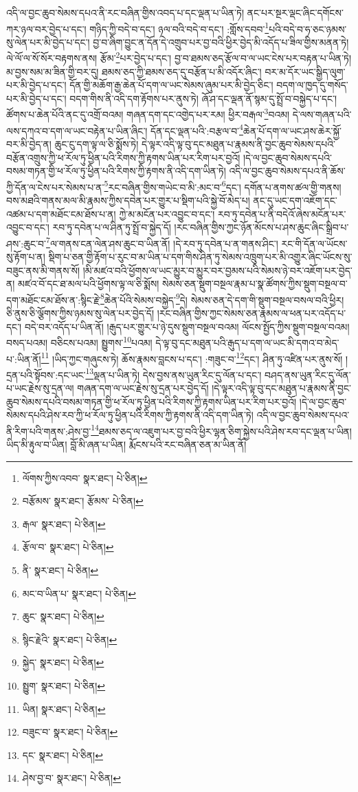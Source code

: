 འདི་ལ་བྱང་ཆུབ་སེམས་དཔའ་ནི་རང་བཞིན་གྱིས་འབད་པ་དང་ལྡན་པ་ཡིན་ཏེ། ནང་པར་སྔར་ལྡང་ཞིང་དགོངས་ཀར་ཉལ་བར་བྱེད་པ་དང་། གཉིད་ཀྱི་བདེ་བ་དང་། ཉལ་བའི་བདེ་བ་དང་། :གློས་དབབ་\footnote{ལོགས་ཀྱིས་འབབ་  སྣར་ཐང་།  པེ་ཅིན། }པའི་བདེ་བ་ཧ་ཅང་ཉམས་སུ་ལེན་པར་མི་བྱེད་པ་དང་། བྱ་བ་ཞིག་བྱུང་ན་དོན་དེ་འགྲུབ་པར་བྱ་བའི་ཕྱིར་བྱེད་མི་འདོད་པ་ཟིལ་གྱིས་མནན་ཏེ། ལེ་ལོ་ལ་སོ་སོར་བརྟགས་ནས། རྩོམ་\footnote{བརྩོམས་  སྣར་ཐང་། རྩོམས་  པེ་ཅིན། }པར་བྱེད་པ་དང་། བྱ་བ་ཐམས་ཅད་རྩོལ་བ་ལ་ཡང་ངེས་པར་བརྟན་པ་ཡིན་ཏེ། མ་བྱས་སམ་མ་ཟིན་གྱི་བར་དུ། ཐམས་ཅད་ཀྱི་ཐམས་ཅད་དུ་བརྩོན་པ་མི་འདོར་ཞིང་། བར་མ་དོར་ཡང་སྒྱིད་ལུག་པར་མི་བྱེད་པ་དང་། དོན་གྱི་མཆོག་རྒྱ་ཆེན་པོ་དག་ལ་ཡང་སེམས་ཞུམ་པར་མི་བྱེད་ཅིང་། བདག་ལ་ཁྱད་དུ་གསོད་པར་མི་བྱེད་པ་དང་། བདག་གིས་ནི་འདི་དག་རྟོགས་པར་ནུས་ཏེ། ཞོ་ཤ་དང་ལྡན་ནོ་སྙམ་དུ་སྤྲོ་བ་བསྐྱེད་པ་དང་། ཚོགས་པ་ཆེན་པོའི་ནང་དུ་འགྲོ་བའམ། གཞན་དག་དང་འགྱེད་པར་རམ། ཕྱིར་བརྒལ་\footnote{རྒལ་  སྣར་ཐང་།  པེ་ཅིན། }བའམ། དེ་ལས་གཞན་པའི་ལས་དཀའ་བ་དག་ལ་ཡང་བརྟེན་པ་ཡིན་ཞིང་། དོན་དང་ལྡན་པའི་:བརྩལ་བ་\footnote{རྩོལ་བ་  སྣར་ཐང་།  པེ་ཅིན། }ཆེན་པོ་དག་ལ་ཡང་ཤས་ཆེར་སྐྱོ་བར་མི་བྱེད་ན། ཆུང་ངུ་དག་ལྟ་ལ་ཅི་སྨོས་ཏེ། དེ་ལྟར་འདི་ལྟ་བུ་དང་མཐུན་པ་རྣམས་ནི་བྱང་ཆུབ་སེམས་དཔའི་བརྩོན་འགྲུས་ཀྱི་ཕ་རོལ་ཏུ་ཕྱིན་པའི་རིགས་ཀྱི་རྟགས་ཡིན་པར་རིག་པར་བྱའོ། །དེ་ལ་བྱང་ཆུབ་སེམས་དཔའི་བསམ་གཏན་གྱི་ཕ་རོལ་ཏུ་ཕྱིན་པའི་རིགས་ཀྱི་རྟགས་ནི་འདི་དག་ཡིན་ཏེ། འདི་ལ་བྱང་ཆུབ་སེམས་དཔའ་ནི་ཆོས་ཀྱི་དོན་ལ་ངེས་པར་སེམས་པ་ན་\footnote{ནི་  སྣར་ཐང་།  པེ་ཅིན། }རང་བཞིན་གྱིས་གཡེང་བ་མི་:མང་བ་\footnote{མང་བ་ཡིན་པ་  སྣར་ཐང་།  པེ་ཅིན། }དང་། དགོན་པ་ནགས་ཚལ་གྱི་གནས། བས་མཐའི་གནས་མལ་མི་རྣམས་ཀྱིས་དབེན་པར་གྱུར་པ་སྡིག་པའི་སྐྱེ་བོ་མེད་པ། ནང་དུ་ཡང་དག་འཇོག་དང་འཚམ་པ་དག་མཐོང་ངམ་ཐོས་པ་ན། ཀྱེ་མ་མངོན་པར་འབྱུང་བ་དང་། རབ་ཏུ་དབེན་པ་ནི་བདེའོ་ཞེས་མངོན་པར་འབྱུང་བ་དང་། རབ་ཏུ་དབེན་པ་ལ་ཤིན་ཏུ་སྤྲོ་བ་སྐྱེད་དོ། །རང་བཞིན་གྱིས་ཀྱང་ཉོན་མོངས་པ་ཤས་ཆུང་ཞིང་སྒྲིབ་པ་ཤས་:ཆུང་བ་\footnote{ཆུང་  སྣར་ཐང་།  པེ་ཅིན། }ལ་གནས་ངན་ལེན་ཤས་ཆུང་བ་ཡིན་ནོ། །དེ་རབ་ཏུ་དབེན་པ་ན་གནས་ཤིང་། རང་གི་དོན་ལ་ཡོངས་སུ་རྟོག་པ་ན། སྡིག་པ་ཅན་གྱི་རྟོག་པ་རུང་བ་མ་ཡིན་པ་དག་གིས་ཤིན་ཏུ་སེམས་འཁྲུག་པར་མི་འགྱུར་ཞིང་ཡོངས་སུ་བཟུང་ནས་མི་གནས་སོ། །མི་མཛའ་བའི་ཕྱོགས་ལ་ཡང་མྱུར་བ་མྱུར་བར་བྱམས་པའི་སེམས་ཉེ་བར་འཇོག་པར་བྱེད་ན། མཛའ་བོ་དང་ཐ་མལ་པའི་ཕྱོགས་ལྟ་ལ་ཅི་སྨོས། སེམས་ཅན་སྡུག་བསྔལ་རྣམ་པ་སྣ་ཚོགས་ཀྱིས་སྡུག་བསྔལ་བ་དག་མཐོང་ངམ་ཐོས་ན་:སྙིང་རྗེ་\footnote{སྙིང་རྗེའི་  སྣར་ཐང་།  པེ་ཅིན། }ཆེན་པོའི་སེམས་བསྐྱེད་\footnote{སྐྱེད་  སྣར་ཐང་།  པེ་ཅིན། }དེ། སེམས་ཅན་དེ་དག་གི་སྡུག་བསྔལ་བསལ་བའི་ཕྱིར། ཅི་ནུས་ཅི་ལྕོགས་ཀྱིས་ཉམས་སུ་ལེན་པར་བྱེད་དོ། །རང་བཞིན་གྱིས་ཀྱང་སེམས་ཅན་རྣམས་ལ་ཕན་པར་འདོད་པ་དང་། བདེ་བར་འདོད་པ་ཡིན་ནོ། །རྒུད་པར་གྱུར་པ་ཉེ་དུས་སྡུག་བསྔལ་བའམ། ལོངས་སྤྱོད་ཀྱིས་སྡུག་བསྔལ་བའམ། བསད་པའམ། བཅིངས་པའམ། སྤྱུགས་\footnote{སྤྱུག་  སྣར་ཐང་།  པེ་ཅིན། }པའམ། དེ་ལྟ་བུ་དང་མཐུན་པའི་རྒུད་པ་དག་ལ་ཡང་མི་དགའ་བ་མེད་པ་:ཡིན་ནོ།\footnote{ཡིན།  སྣར་ཐང་།  པེ་ཅིན། } །ཡིད་ཀྱང་གཞུངས་ཏེ། ཆོས་རྣམས་བླངས་པ་དང་། :གཟུང་བ་\footnote{བཟུང་བ་  སྣར་ཐང་།  པེ་ཅིན། }དང་། ཤིན་ཏུ་འཛིན་པར་ནུས་སོ། །དྲན་པའི་སྟོབས་:དང་ཡང་\footnote{དང་  སྣར་ཐང་།  པེ་ཅིན། }ལྡན་པ་ཡིན་ཏེ། དེས་བྱས་ནས་ཡུན་རིང་དུ་ལོན་པ་དང་། བཤད་ནས་ཡུན་རིང་དུ་ལོན་པ་ཡང་རྗེས་སུ་དྲན་ལ། གཞན་དག་ལ་ཡང་རྗེས་སུ་དྲན་པར་བྱེད་དོ། །དེ་ལྟར་འདི་ལྟ་བུ་དང་མཐུན་པ་རྣམས་ནི་བྱང་ཆུབ་སེམས་དཔའི་བསམ་གཏན་གྱི་ཕ་རོལ་ཏུ་ཕྱིན་པའི་རིགས་ཀྱི་རྟགས་ཡིན་པར་རིག་པར་བྱའོ། །དེ་ལ་བྱང་ཆུབ་སེམས་དཔའི་ཤེས་རབ་ཀྱི་ཕ་རོལ་ཏུ་ཕྱིན་པའི་རིགས་ཀྱི་རྟགས་ནི་འདི་དག་ཡིན་ཏེ། འདི་ལ་བྱང་ཆུབ་སེམས་དཔའ་ནི་རིག་པའི་གནས་:ཤེས་བྱ་\footnote{ཤེས་བྱ་བ་  སྣར་ཐང་།  པེ་ཅིན། }ཐམས་ཅད་ལ་འཇུག་པར་བྱ་བའི་ཕྱིར་ལྷན་ཅིག་སྐྱེས་པའི་ཤེས་རབ་དང་ལྡན་པ་ཡིན། ཡིད་མི་རྟུལ་བ་ཡིན། བློ་མི་ཞན་པ་ཡིན། རྨོངས་པའི་རང་བཞིན་ཅན་མ་ཡིན་ནོ། 